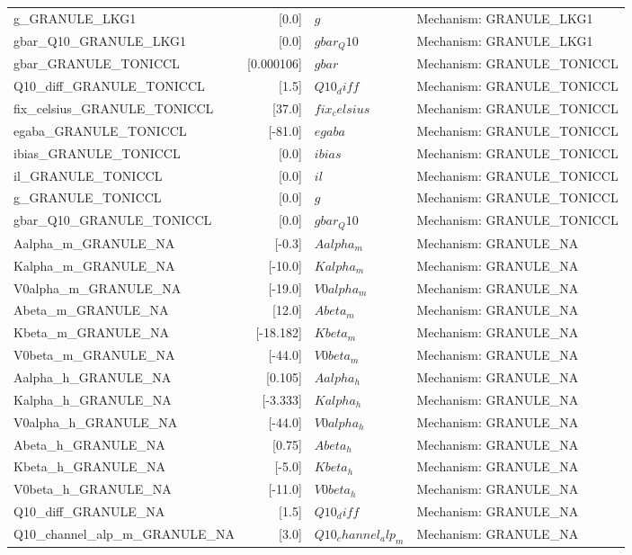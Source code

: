 \begin{tabular}{|l|r|l|l|}
g_GRANULE_LKG1 & [0.0] & $g$ & Mechanism: GRANULE_LKG1 \\
gbar_Q10_GRANULE_LKG1 & [0.0] & $gbar_Q10$ & Mechanism: GRANULE_LKG1 \\
gbar_GRANULE_TONICCL & [0.000106] & $gbar$ & Mechanism: GRANULE_TONICCL \\
Q10_diff_GRANULE_TONICCL & [1.5] & $Q10_diff$ & Mechanism: GRANULE_TONICCL \\
fix_celsius_GRANULE_TONICCL & [37.0] & $fix_celsius$ & Mechanism: GRANULE_TONICCL \\
egaba_GRANULE_TONICCL & [-81.0] & $egaba$ & Mechanism: GRANULE_TONICCL \\
ibias_GRANULE_TONICCL & [0.0] & $ibias$ & Mechanism: GRANULE_TONICCL \\
il_GRANULE_TONICCL & [0.0] & $il$ & Mechanism: GRANULE_TONICCL \\
g_GRANULE_TONICCL & [0.0] & $g$ & Mechanism: GRANULE_TONICCL \\
gbar_Q10_GRANULE_TONICCL & [0.0] & $gbar_Q10$ & Mechanism: GRANULE_TONICCL \\
Aalpha_m_GRANULE_NA & [-0.3] & $Aalpha_m$ & Mechanism: GRANULE_NA \\
Kalpha_m_GRANULE_NA & [-10.0] & $Kalpha_m$ & Mechanism: GRANULE_NA \\
V0alpha_m_GRANULE_NA & [-19.0] & $V0alpha_m$ & Mechanism: GRANULE_NA \\
Abeta_m_GRANULE_NA & [12.0] & $Abeta_m$ & Mechanism: GRANULE_NA \\
Kbeta_m_GRANULE_NA & [-18.182] & $Kbeta_m$ & Mechanism: GRANULE_NA \\
V0beta_m_GRANULE_NA & [-44.0] & $V0beta_m$ & Mechanism: GRANULE_NA \\
Aalpha_h_GRANULE_NA & [0.105] & $Aalpha_h$ & Mechanism: GRANULE_NA \\
Kalpha_h_GRANULE_NA & [-3.333] & $Kalpha_h$ & Mechanism: GRANULE_NA \\
V0alpha_h_GRANULE_NA & [-44.0] & $V0alpha_h$ & Mechanism: GRANULE_NA \\
Abeta_h_GRANULE_NA & [0.75] & $Abeta_h$ & Mechanism: GRANULE_NA \\
Kbeta_h_GRANULE_NA & [-5.0] & $Kbeta_h$ & Mechanism: GRANULE_NA \\
V0beta_h_GRANULE_NA & [-11.0] & $V0beta_h$ & Mechanism: GRANULE_NA \\
Q10_diff_GRANULE_NA & [1.5] & $Q10_diff$ & Mechanism: GRANULE_NA \\
Q10_channel_alp_m_GRANULE_NA & [3.0] & $Q10_channel_alp_m$ & Mechanism: GRANULE_NA \\

\end{tabular}
